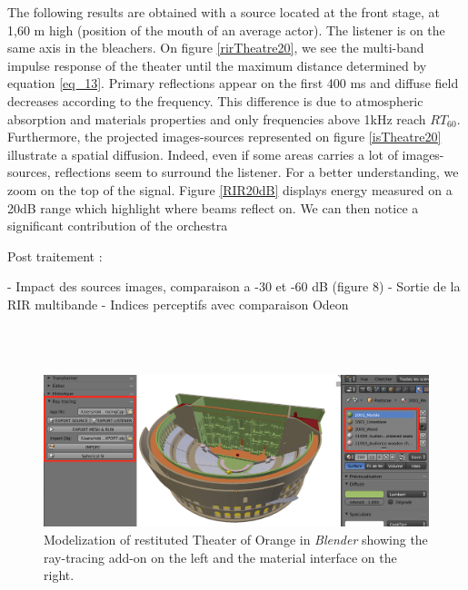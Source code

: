 \documentclass[AMA,STIX1COL]{WileyNJD-v2}
\begin{document}
The following results are obtained with a source located at the front stage, at 1,60 m high (position of the mouth of an average actor). The listener is on the same axis in the bleachers. On figure \ref{rirTheatre20}, we see the multi-band impulse response of the theater until the maximum distance determined by equation \ref{eq_13}. Primary reflections appear on the first 400 ms and diffuse field decreases according to the frequency. This difference is due to atmospheric absorption and materials properties and only frequencies above 1kHz reach $RT_{60}$. Furthermore, the projected images-sources represented on figure \ref{isTheatre20} illustrate a spatial diffusion. Indeed, even if some areas carries a lot of images-sources, reflections seem to surround the listener. For a better understanding, we zoom on the top of the signal. Figure \ref{RIR20dB} displays energy measured on a 20dB range which highlight where beams reflect on. We can then notice a significant contribution of the orchestra




Post traitement : 

 - Impact des sources images, comparaison a -30 et -60 dB (figure 8)
 - Sortie de la RIR multibande
 - Indices perceptifs avec comparaison Odeon

~\\~\\


\begin{figure}[t]
\centering
		\includegraphics[width=0.9\linewidth]{soft}
		\caption{Modelization of restituted Theater of Orange \cite{theseRobin} in \textit{Blender} showing the ray-tracing add-on on the left and the material interface on the right.}
		\label{soft}
\end{figure}
\end{document}
